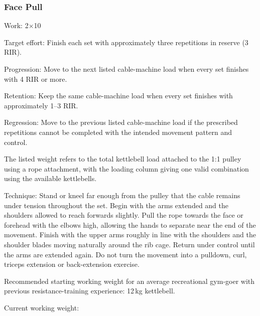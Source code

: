 \documentclass[11pt,a4paper]{article}
\begin{document}
\newpage
\subsubsection{Face Pull}

Work: 2$\times$10

Target effort: Finish each set with approximately three repetitions in reserve (3 RIR).

Progression: Move to the next listed cable-machine load when every set finishes with 4 RIR or more.

Retention: Keep the same cable-machine load when every set finishes with approximately 1--3 RIR.

Regression: Move to the previous listed cable-machine load if the prescribed repetitions cannot be completed with the intended movement pattern and control.

The listed weight refers to the total kettlebell load attached to the 1:1 pulley using a rope attachment, with the loading column giving one valid combination using the available kettlebells.

Technique: Stand or kneel far enough from the pulley that the cable remains under tension throughout the set. Begin with the arms extended and the shoulders allowed to reach forwards slightly. Pull the rope towards the face or forehead with the elbows high, allowing the hands to separate near the end of the movement. Finish with the upper arms roughly in line with the shoulders and the shoulder blades moving naturally around the rib cage. Return under control until the arms are extended again. Do not turn the movement into a pulldown, curl, triceps extension or back-extension exercise.

Recommended starting working weight for an average recreational gym-goer with previous resistance-training experience: 12\,kg kettlebell.

Current working weight:
\end{document}
